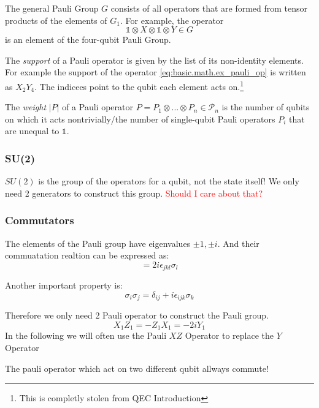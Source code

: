 The general Pauli Group $G$ consists of all operators that are formed from tensor products of the elements of $G_1$. 
For example, the operator
\begin{equation}
    \mathds{1} \otimes X \otimes \mathds{1} \otimes Y \in G
    \label{eq:basic.math.ex_pauli_op}
\end{equation}
is an element of the four-qubit Pauli Group. 

The \textit{support} of a Pauli operator is given by the list of its non-identity elements.
For example the support of the operator \ref{eq:basic.math.ex_pauli_op} is written as $X_2Y_4$.
The indicees point to the qubit each element acts on.\footnote{This is completly stolen from QEC Introduction} \cite{QECintro}

The \textit{weight} $|P|$ of a Pauli operator $P=P_1 \otimes... \otimes P_n \in \mathcal{P}_n $ is 
the number of qubits on which it acts nontrivially/the number of single-qubit Pauli operators 
$P_i$ that are unequal to $\mathds{1}$. \cite{QECmemory}

\subsubsection{SU(2)}
$SU(2)$ is the group of the operators for a qubit, not the state itself!
We only need 2 generators to construct this group.
\textcolor{red}{Should I care about that?}


\subsubsection{Commutators}
The elements of the Pauli group have eigenvalues ${\pm 1,\pm i}$.
And their commuatation realtion can be expressed as:
\begin{equation}
    [\sigma_j,\sigma_k] = 2 i \epsilon_{jkl} \sigma_l
\end{equation}

Another important property is:
\begin{equation}
    \sigma_i \sigma_j = \delta_{ij} + i \epsilon_{ijk} \sigma_k
\end{equation}

Therefore we only need 2 Pauli operator to construct the Pauli group.
\begin{equation}
    X_1 Z_1 = - Z_1 X_1 = -2 i Y_1
\end{equation}
In the following we will often use the Pauli $XZ$ Operator to replace the $Y$ Operator 

The pauli operator which act on two different qubit allways commute!

